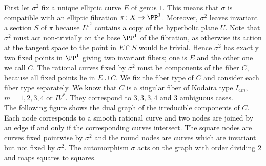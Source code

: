First let $\sigma^2$ fix a unique elliptic curve $E$ of genus $1$. This means that $\sigma$ is compatible with an elliptic fibration $\pi\colon X \to \PP^1$.
Moreover, $\sigma^2$ leaves invariant a section $S$ of $\pi$ because $L^{\sigma^2}$ contains a copy of the hyperbolic plane $U$. Note that $\sigma^2$ must act non-trivially on the base $\PP^1$ of the fibration, as otherwise its action at the tangent space to the point in $E\cap S$ would be trivial.
Hence $\sigma^2$ has exactly two fixed points in $\PP^1$ giving two invariant fibers; one is $E$ and the other one we call $C$.
The rational curves fixed by $\sigma^2$ must be components of the fiber $C$, because all fixed points lie in $E \cup C$.
We fix the fiber type of $C$ and consider each fiber type separately.
We know that $C$ is a singular fiber of Kodaira type $I_{4m}$, $m=1,2,3,4$ or $IV^*$. They correspond to $3,3,3,4$ and $3$ ambiguous cases.\\[4pt]
The following figure shows the dual graph of the irreducible components of $C$. Each node corresponds to a smooth rational curve and two nodes are joined by an edge if and only if the corresponding curves intersect. The square nodes are curves fixed pointwise by $\sigma^2$ and the round nodes are curves which are invariant but not fixed by $\sigma^2$.
The automorphism $\sigma$ acts on the graph with order dividing $2$ and maps squares to squares.

